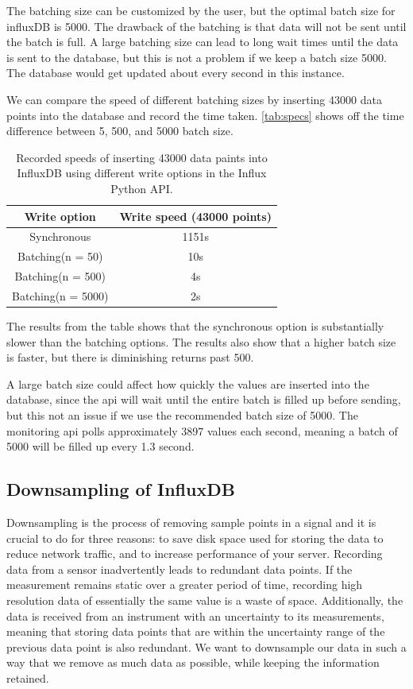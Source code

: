 \documentclass[main.tex]{subfiles}
\begin{document}
The batching size can be customized by the user, but the optimal batch size for influxDB is 5000\cite{influx_batching}. The drawback of the batching is that data will not be sent until the batch is full. A large batching size can lead to long wait times until the data is sent to the database, but this is not a problem if we keep a batch size 5000. The database would get updated about every second in this instance.

We can compare the speed of different batching sizes by inserting 43000 data points into the database and record the time taken. \autoref{tab:specs} shows off the time difference between 5, 500, and 5000 batch size.
\begin{table}[h]
\centering
\begin{tabular}{||c c||} 
 \hline
 Write option & Write speed (43000 points)\\ [0.5ex] 
 \hline\hline
 Synchronous & 1151s \\ 
 \hline
 Batching(n = 50) & 10s  \\
 \hline
 Batching(n = 500) & 4s \\
 \hline
 Batching(n = 5000) & 2s\\ [1ex]
\hline

\end{tabular}
\caption{\label{tab:specs} Recorded speeds of inserting 43000 data paints into InfluxDB using different write options in the Influx Python API.}
\end{table}
\FloatBarrier

The results from the table shows that the synchronous option is substantially slower than the batching options. The results also show that a higher batch size is faster, but there is diminishing returns past 500. 

A large batch size could affect how quickly the values are inserted into the database, since the \gls{api} will wait until the entire batch is filled up before sending, but this not an issue if we use the recommended batch size of 5000. The monitoring \gls{api} polls approximately 3897 values each second, meaning a batch of 5000 will be filled up every 1.3 second.

 
 
 \subsection{Downsampling of InfluxDB}
 \label{ssec: downsampling}

 Downsampling is the process of removing sample points in a signal and it is crucial to do for three reasons: to save disk space used for storing the data to reduce network traffic, and to increase performance of your server. Recording data from a sensor inadvertently leads to redundant data points. If the measurement remains static over a greater period of time, recording high resolution data of essentially the same value is a waste of space. Additionally, the data is received from an instrument with an uncertainty to its measurements, meaning that storing data points that are within the uncertainty range of the previous data point is also redundant. We want to downsample our data in such a way that we remove as much data as possible, while keeping the information retained.
 
\end{document}
